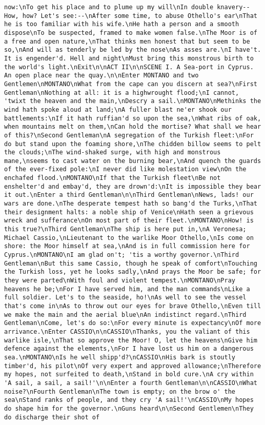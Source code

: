 \begin{verbatim}
now:\nTo get his place and to plume up my will\nIn double knavery--How, how? Let's see:--\nAfter some time, to abuse Othello's ear\nThat he is too familiar with his wife.\nHe hath a person and a smooth dispose\nTo be suspected, framed to make women false.\nThe Moor is of a free and open nature,\nThat thinks men honest that but seem to be so,\nAnd will as tenderly be led by the nose\nAs asses are.\nI have't. It is engender'd. Hell and night\nMust bring this monstrous birth to the world's light.\nExit\n\nACT II\n\nSCENE I. A Sea-port in Cyprus. An open place near the quay.\n\nEnter MONTANO and two Gentlemen\nMONTANO\nWhat from the cape can you discern at sea?\nFirst Gentleman\nNothing at all: it is a highwrought flood;\nI cannot, 'twixt the heaven and the main,\nDescry a sail.\nMONTANO\nMethinks the wind hath spoke aloud at land;\nA fuller blast ne'er shook our battlements:\nIf it hath ruffian'd so upon the sea,\nWhat ribs of oak, when mountains melt on them,\nCan hold the mortise? What shall we hear of this?\nSecond Gentleman\nA segregation of the Turkish fleet:\nFor do but stand upon the foaming shore,\nThe chidden billow seems to pelt the clouds;\nThe wind-shaked surge, with high and monstrous mane,\nseems to cast water on the burning bear,\nAnd quench the guards of the ever-fixed pole:\nI never did like molestation view\nOn the enchafed flood.\nMONTANO\nIf that the Turkish fleet\nBe not enshelter'd and embay'd, they are drown'd:\nIt is impossible they bear it out.\nEnter a third Gentleman\n\nThird Gentleman\nNews, lads! our wars are done.\nThe desperate tempest hath so bang'd the Turks,\nThat their designment halts: a noble ship of Venice\nHath seen a grievous wreck and sufferance\nOn most part of their fleet.\nMONTANO\nHow! is this true?\nThird Gentleman\nThe ship is here put in,\nA Veronesa; Michael Cassio,\nLieutenant to the warlike Moor Othello,\nIs come on shore: the Moor himself at sea,\nAnd is in full commission here for Cyprus.\nMONTANO\nI am glad on't; 'tis a worthy governor.\nThird Gentleman\nBut this same Cassio, though he speak of comfort\nTouching the Turkish loss, yet he looks sadly,\nAnd prays the Moor be safe; for they were parted\nWith foul and violent tempest.\nMONTANO\nPray heavens he be;\nFor I have served him, and the man commands\nLike a full soldier. Let's to the seaside, ho!\nAs well to see the vessel that's come in\nAs to throw out our eyes for brave Othello,\nEven till we make the main and the aerial blue\nAn indistinct regard.\nThird Gentleman\nCome, let's do so:\nFor every minute is expectancy\nOf more arrivance.\nEnter CASSIO\n\nCASSIO\nThanks, you the valiant of this warlike isle,\nThat so approve the Moor! O, let the heavens\nGive him defence against the elements,\nFor I have lost us him on a dangerous sea.\nMONTANO\nIs he well shipp'd?\nCASSIO\nHis bark is stoutly timber'd, his pilot\nOf very expert and approved allowance;\nTherefore my hopes, not surfeited to death,\nStand in bold cure.\nA cry within 'A sail, a sail, a sail!'\n\nEnter a fourth Gentleman\n\nCASSIO\nWhat noise?\nFourth Gentleman\nThe town is empty; on the brow o' the sea\nStand ranks of people, and they cry 'A sail!'\nCASSIO\nMy hopes do shape him for the governor.\nGuns heard\n\nSecond Gentlemen\nThey do discharge their shot of 
\end{verbatim}
